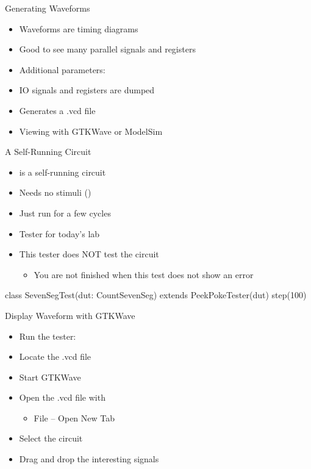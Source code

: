 \begin{frame}[fragile]{Generating Waveforms}
\begin{itemize}
\item Waveforms are timing diagrams
\item Good to see many parallel signals and registers
\item Additional parameters: 
\item IO signals and registers are dumped
\item Generates a .vcd file
\item Viewing with GTKWave or ModelSim
\end{itemize}
\end{frame}

\begin{frame}[fragile]{A Self-Running Circuit}
\begin{itemize}
\item {} is a self-running circuit
\item Needs no stimuli ()
\item Just run for a few cycles
\item Tester for today's lab
\item This tester does NOT test the circuit
\begin{itemize}
\item You are not finished when this test does not show an error
\end{itemize}
\end{itemize}
\begin{chisel}
class SevenSegTest(dut: CountSevenSeg) extends PeekPokeTester(dut) {
  step(100)
}
\end{chisel}
\end{frame}

\begin{frame}[fragile]{Display Waveform with GTKWave}
\begin{itemize}
\item Run the tester: 
\item Locate the .vcd file
\item Start GTKWave
\item Open the .vcd file with
\begin{itemize}
\item File -- Open New Tab
\end{itemize}
\item Select the circuit
\item Drag and drop the interesting signals
\end{itemize}
\end{frame}



